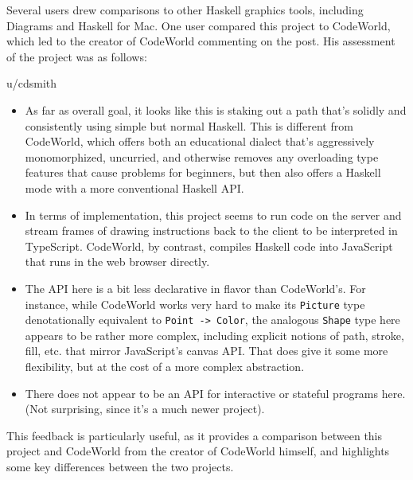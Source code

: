 \documentclass[../main.tex]{subfiles}
\begin{document}
            Several users drew comparisons to other Haskell graphics tools, including
                Diagrams and Haskell for Mac.
            One user compared this project to CodeWorld, which led to the creator of
                CodeWorld commenting on the post.
            His assessment of the project was as follows:
            \begin{aquote}{u/cdsmith}
                \begin{itemize}
                    \item As far as overall goal, it looks like this is
                          staking out a path that's solidly and consistently using simple but normal
                          Haskell.
                          This is different from CodeWorld, which offers both an educational dialect
                              that's aggressively monomorphized, uncurried, and otherwise removes any
                              overloading type features that cause problems for beginners, but then also
                              offers a Haskell mode with a more conventional Haskell API.
                    \item In terms of implementation, this project seems to run code on the server and
                          stream frames of drawing instructions back to the client to be interpreted in
                          TypeScript.
                          CodeWorld, by contrast, compiles Haskell code into JavaScript that runs in the
                              web browser directly.
                    \item The API here is a bit less declarative in flavor than CodeWorld's.
                          For instance, while CodeWorld works very hard to make its \texttt{Picture} type
                              denotationally equivalent to \texttt{Point -> Color}, the analogous
                              \texttt{Shape} type here appears to be rather more complex, including explicit
                              notions of path, stroke, fill, etc. that mirror JavaScript's canvas API.
                          That does give it some more flexibility, but at the cost of a more complex
                              abstraction.
                    \item There does not appear to be an API for interactive or stateful programs here.
                          (Not surprising, since it's a much newer project).
                \end{itemize}
            \end{aquote}
            This feedback is particularly useful, as it provides a comparison between this
                project and CodeWorld from the creator of CodeWorld himself, and highlights
                some key differences between the two projects.
\end{document}
